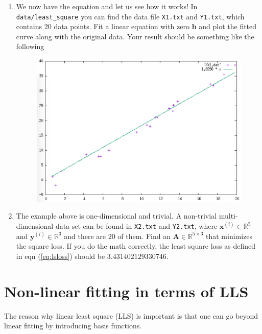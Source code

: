 \documentclass[a4paper,twoside, 10pt]{article}
\theoremstyle{wick}
\newcommand{\mat}[1]{\mathbf{#1}}
\newcommand{\ttt}{\texttt}
\begin{document}
\begin{enumerate}
		\item We now have the equation and let us see how it works! In \ttt{data/least\_square} you can find the data file \ttt{X1.txt} and \ttt{Y1.txt}, which contains $20$ data points. Fit a linear equation with zero $\bm{b}$ and plot the fitted curve along with the original data. Your result should be something like the following
		\begin{figure}[H]
			\centering
			\includegraphics[width=0.6\linewidth]{plot/least_square/XY1.png}
		\end{figure}

		\item The example above is one-dimensional and trivial. A non-trivial multi-dimensional data set can be found in \ttt{X2.txt} and \ttt{Y2.txt}, where $\bm{x}^{(i)} \in \mathbb{R}^{5}$ and $\bm{y}^{(i)} \in \mathbb{R}^3$ and there are $20$ of them. Find an $\mat{A} \in \mathbb{R}^{5 \times{} 3}$ that minimizes the square loss. If you do the math correctly, the least square loss as defined in eqn (\ref{eq:lsloss}) should be $3.431402129330746$.
	\end{enumerate}

	\section{Non-linear fitting in terms of LLS}

	The reason why linear least square (LLS) is important is that one can go beyond linear fitting by introducing basis functions.
\end{document}

